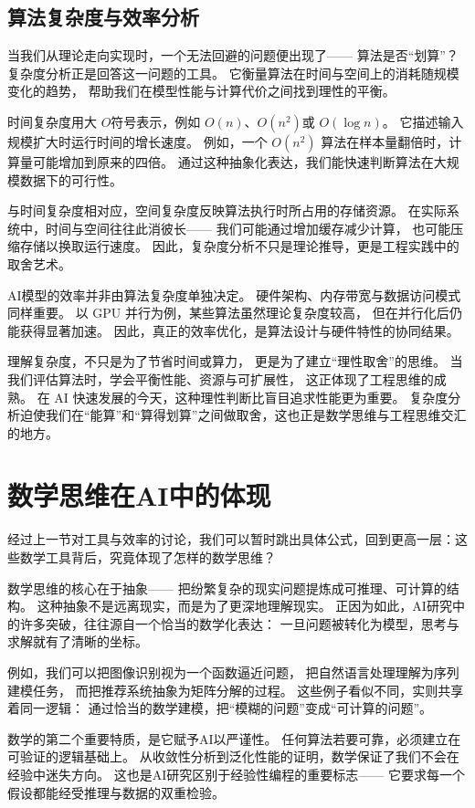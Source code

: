 \subsection{算法复杂度与效率分析}

当我们从理论走向实现时，一个无法回避的问题便出现了——  
算法是否“划算”？  
复杂度分析正是回答这一问题的工具。  
它衡量算法在时间与空间上的消耗随规模变化的趋势，  
帮助我们在模型性能与计算代价之间找到理性的平衡。

时间复杂度用大 $O$符号表示，例如 $O(n)$、$O(n^2)$或 $O(\log n)$。  
它描述输入规模扩大时运行时间的增长速度。  
例如，一个 $O(n^2)$ 算法在样本量翻倍时，计算量可能增加到原来的四倍。  
通过这种抽象化表达，我们能快速判断算法在大规模数据下的可行性。

与时间复杂度相对应，空间复杂度反映算法执行时所占用的存储资源。  
在实际系统中，时间与空间往往此消彼长——  
我们可能通过增加缓存减少计算，  
也可能压缩存储以换取运行速度。  
因此，复杂度分析不只是理论推导，更是工程实践中的取舍艺术。

AI模型的效率并非由算法复杂度单独决定。  
硬件架构、内存带宽与数据访问模式同样重要。  
以 GPU 并行为例，某些算法虽然理论复杂度较高，  
但在并行化后仍能获得显著加速。  
因此，真正的效率优化，是算法设计与硬件特性的协同结果。

理解复杂度，不只是为了节省时间或算力，  
更是为了建立“理性取舍”的思维。  
当我们评估算法时，学会平衡性能、资源与可扩展性，  
这正体现了工程思维的成熟。  
在 AI 快速发展的今天，这种理性判断比盲目追求性能更为重要。
复杂度分析迫使我们在“能算”和“算得划算”之间做取舍，这也正是数学思维与工程思维交汇的地方。

\section{数学思维在AI中的体现}

经过上一节对工具与效率的讨论，我们可以暂时跳出具体公式，回到更高一层：这些数学工具背后，究竟体现了怎样的数学思维？

数学思维的核心在于抽象——  
把纷繁复杂的现实问题提炼成可推理、可计算的结构。  
这种抽象不是远离现实，而是为了更深地理解现实。  
正因为如此，AI研究中的许多突破，往往源自一个恰当的数学化表达：  
一旦问题被转化为模型，思考与求解就有了清晰的坐标。

例如，我们可以把图像识别视为一个函数逼近问题，  
把自然语言处理理解为序列建模任务，  
而把推荐系统抽象为矩阵分解的过程。  
这些例子看似不同，实则共享着同一逻辑：  
通过恰当的数学建模，把“模糊的问题”变成“可计算的问题”。

数学的第二个重要特质，是它赋予AI以严谨性。  
任何算法若要可靠，必须建立在可验证的逻辑基础上。  
从收敛性分析到泛化性能的证明，数学保证了我们不会在经验中迷失方向。  
这也是AI研究区别于经验性编程的重要标志——  
它要求每一个假设都能经受推理与数据的双重检验。

